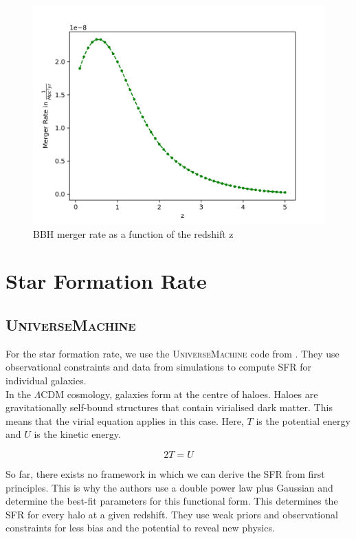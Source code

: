 \begin{figure}[h]
    \centering
    \includegraphics[width=1\linewidth]{Images/bbh_merger_rate.png}
    \caption{BBH merger rate as a function of the redshift z}
    \label{bbh_merger_rate}
   \end{figure} 

\section{Star Formation Rate}
\subsection{\textsc{UniverseMachine}}

For the star formation rate, we use the \textsc{UniverseMachine} code from \cite{behroozi_universemachine_2019}. They use observational constraints and data from simulations to compute SFR for individual galaxies. \\

In the $\Lambda$CDM cosmology, galaxies form at the centre of haloes. Haloes are gravitationally self-bound structures that contain virialised dark matter. This means that the virial equation applies in this case. Here, $T$ is the potential energy and $U$ is the kinetic energy.

\begin{equation}
    2T=U
\end{equation}

So far, there exists no framework in which we can derive the SFR from first principles. This is why the authors use a double power law plus Gaussian and determine the best-fit parameters for this functional form. This determines the SFR for every halo at a given redshift. They use weak priors and observational constraints for less bias and the potential to reveal new physics.

